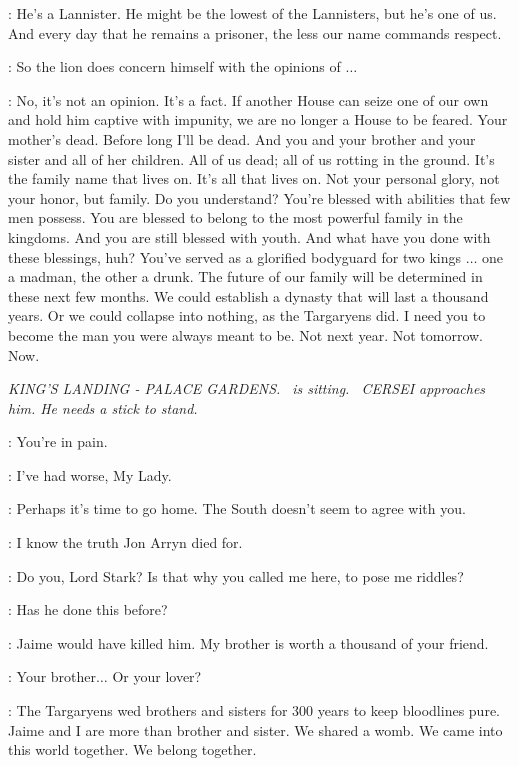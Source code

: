 \TYWIN: He's a Lannister. He might be the lowest of the Lannisters, but he's one of us. And every day that he remains a prisoner, the less our name commands respect. 

\JAIME: So the lion does concern himself with the opinions of $\ldots$  

\TYWIN: No, it's not an opinion. It's a fact.  If another House can seize one of our own and hold him captive with impunity, we are no longer a House to be feared.  Your mother's dead.  Before long I'll be dead.  And you and your brother and your sister and all of her children. All of us dead; all of us rotting in the ground.  It's the family name that lives on. It's all that lives on.  Not your personal glory, not your honor, but family.  Do you understand? You're blessed with abilities that few men possess. You are blessed to belong to the most powerful family in the kingdoms. And you are still blessed with youth. And what have you done with these blessings, huh? You've served as a glorified bodyguard for two kings $\ldots$ one a madman, the other a drunk. The future of our family will be determined in these next few months. We could establish a dynasty that will last a thousand years. Or we could collapse into nothing, as the Targaryens did. I need you to become the man you were always meant to be. Not next year. Not tomorrow. Now. 


\scene

\textit{ KING'S LANDING - PALACE GARDENS.}
\textit{ \NED ~is sitting. ~CERSEI approaches him. He needs a stick to stand.}

\CERSEI: You're in pain. 

\NED: I've had worse, My Lady. 

\CERSEI: Perhaps it's time to go home. The South doesn't seem to agree with you. 

\NED: I know the truth Jon Arryn died for. 

\CERSEI: Do you, Lord Stark? Is that why you called me here, to pose me riddles? 

\NED:  Has he done this before? 

\CERSEI: Jaime would have killed him. My brother is worth a thousand of your friend. 

\NED: Your brother$\ldots$ Or your lover? 

\CERSEI: The Targaryens wed brothers and sisters for 300 years to keep bloodlines pure. Jaime and I are more than brother and sister. We shared a womb. We came into this world together. We belong together. 


